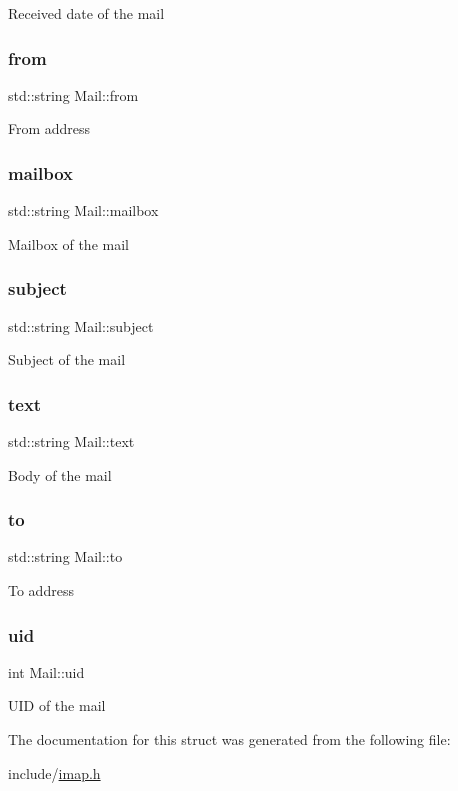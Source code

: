Received date of the mail \mbox{\label{structMail_ab870c9583b0e46138dc1a8f1d1b65a3d}} 
\subsubsection{\texorpdfstring{from}{from}}
{\footnotesize\ttfamily std\+::string Mail\+::from}

From address \mbox{\label{structMail_ad3818de846b58c9865ad79c74ef38d4f}} 
\subsubsection{\texorpdfstring{mailbox}{mailbox}}
{\footnotesize\ttfamily std\+::string Mail\+::mailbox}

Mailbox of the mail \mbox{\label{structMail_a8bc2e13257b7a771c9065e35aaf02744}} 
\subsubsection{\texorpdfstring{subject}{subject}}
{\footnotesize\ttfamily std\+::string Mail\+::subject}

Subject of the mail \mbox{\label{structMail_a41cf2dc6ed53c53e9c85e9c9dc5caa61}} 
\subsubsection{\texorpdfstring{text}{text}}
{\footnotesize\ttfamily std\+::string Mail\+::text}

Body of the mail \mbox{\label{structMail_a4fdcc092522dd634b8085b7c8e7831e8}} 
\subsubsection{\texorpdfstring{to}{to}}
{\footnotesize\ttfamily std\+::string Mail\+::to}

To address \mbox{\label{structMail_acbed469265bf0f0ad1c77b07e935dd05}} 
\subsubsection{\texorpdfstring{uid}{uid}}
{\footnotesize\ttfamily int Mail\+::uid}

U\+ID of the mail 

The documentation for this struct was generated from the following file\+:\begin{DoxyCompactItemize}
\item 
include/\hyperlink{imap_8h}{imap.\+h}\end{DoxyCompactItemize}
